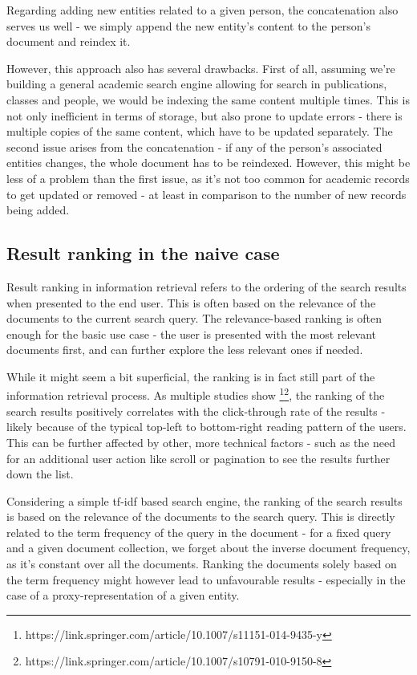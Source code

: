 Regarding adding new entities related to a given person, the concatenation also serves us well - we simply append the new entity's content to the person's document and reindex it.

However, this approach also has several drawbacks. First of all, assuming we're building a general academic search engine allowing for search in publications, classes and people, we would be indexing the same content multiple times.
This is not only inefficient in terms of storage, but also prone to update errors - there is multiple copies of the same content, which have to be updated separately.
The second issue arises from the concatenation - if any of the person's associated entities changes, the whole document has to be reindexed.
However, this might be less of a problem than the first issue, as it's not too common for academic records to get updated or removed - at least in comparison to the number of new records being added.

\subsection{Result ranking in the naive case} \label{search-ranking-issues}

Result ranking in information retrieval refers to the ordering of the search results when presented to the end user. This is often based on the relevance of the documents to the current search query.
The relevance-based ranking is often enough for the basic use case - the user is presented with the most relevant documents first, and can further explore the less relevant ones if needed.

While it might seem a bit superficial, the ranking is in fact still part of the information retrieval process. 
As multiple studies show \footnote{https://link.springer.com/article/10.1007/s11151-014-9435-y}\footnote{https://link.springer.com/article/10.1007/s10791-010-9150-8}, 
the ranking of the search results positively correlates with the click-through rate of the results 
- likely because of the typical top-left to bottom-right reading pattern of the users.
This can be further affected by other, more technical factors - such as the need for an additional user action like scroll or pagination to see the results further down the list.


Considering a simple tf-idf based search engine, the ranking of the search results is based on the relevance of the documents to the search query.
This is directly related to the term frequency of the query in the document - for a fixed query and a given document collection, we forget about the inverse document frequency, as it's constant over all the documents.
Ranking the documents solely based on the term frequency might however lead to unfavourable results - especially in the case of a proxy-representation of a given entity.


